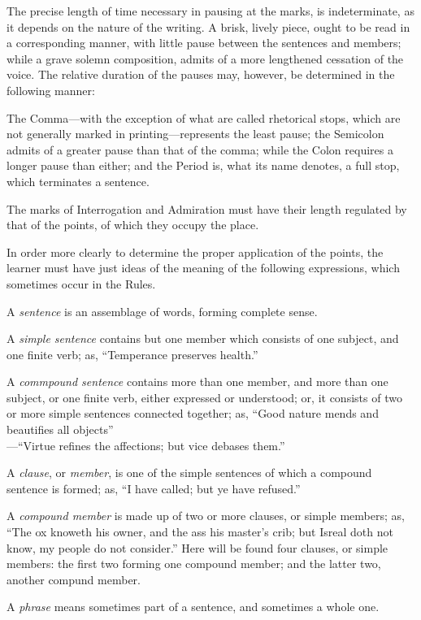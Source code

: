 \small
The precise length of time necessary in pausing at the marks, is indeterminate,
as it depends on the nature of the writing. A brisk, lively piece, ought to be
read in a corresponding manner, with little pause between the sentences and
members; while a grave solemn composition, admits of a more lengthened cessation
of the voice. The relative duration of the pauses may, however, be determined in
the following manner:

The Comma---with the exception of what are called rhetorical stops, which are
not generally marked in printing---represents the least pause; the Semicolon
admits of a greater pause than that of the comma; while the Colon requires a
longer pause than either; and the Period is, what its name denotes, a full stop,
which terminates a sentence.

The marks of Interrogation and Admiration must have their length regulated by
that of the points, of which they occupy the place.

In order more clearly to determine the proper application of the points, the
learner must have just ideas of the meaning of the following expressions, which
sometimes occur in the Rules.

A \emph{sentence} is an assemblage of words, forming complete sense.

A \emph{simple sentence} contains but one member which consists of one subject,
and one finite verb; as, ``Temperance preserves health.''

A \emph{commpound sentence} contains more than one member, and more than one
subject, or one finite verb, either expressed or understood; or, it consists of
two or more simple sentences connected together; as, ``Good nature mends and
beautifies all objects''\\---``Virtue refines the affections; but vice debases
them.''

A \emph{clause}, or \emph{member}, is one of the simple sentences of which a
compound sentence is formed; as, ``I have called; but ye have refused.''

A \emph{compound member} is made up of two or more clauses, or simple members;
as, ``The ox knoweth his owner, and the ass his master's crib; but Isreal doth
not know, my people do not consider.'' Here will be found four clauses, or
simple members: the first two forming one compound member; and the latter two,
another compund member.

A \emph{phrase} means sometimes part of a sentence, and sometimes a whole one.

